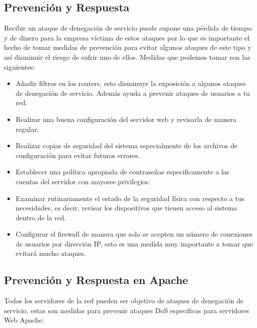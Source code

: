 \documentclass[a4paper, 10pt]{article} %
\begin{document}
\subsection{Prevención y Respuesta}
Recibir un ataque de denegación de servicio puede supone una pérdida de tiempo y de dinero para la empresa víctima de estos ataques por lo que es importante el hecho de tomar medidas de prevención para evitar algunos ataques de este tipo y así disminuir el riesgo de sufrir uno de ellos. Medidas que podemos tomar son las siguientes:
\begin{itemize}
\item Añadir filtros en los routers, esto disminuye la exposición a algunos ataques de denegación de servicio. Además ayuda a prevenir ataques de usuarios a tu red.
\item Realizar una buena configuración del servidor web y revisarla de manera regular.
\item Realizar copias de seguridad del sistema especialmente de los archivos de configuración para evitar futuros errores.
\item Establecer una política apropiada de contraseñas especificamente a las cuentas del servidor con mayores privilegios.
\item Examinar rutinariamente el estado de la seguridad física con respecto a tus necesidades, es decir, revisar los dispositivos que tienen acceso al sistema dentro de la red.
\item Configurar el firewall de manera que solo se acepten un número de conexiones de usuarios por dirección IP, esto es una medida muy importante a tomar que evitará mucho ataques.
\end{itemize}
\subsection{Prevención y Respuesta en Apache}
\cite{3} Todos los servidores de la red pueden ser objetivo de ataques de denegación de servicio, estas son medidas para prevenir ataques DoS especificas para servidores Web Apache:
\end{document}
